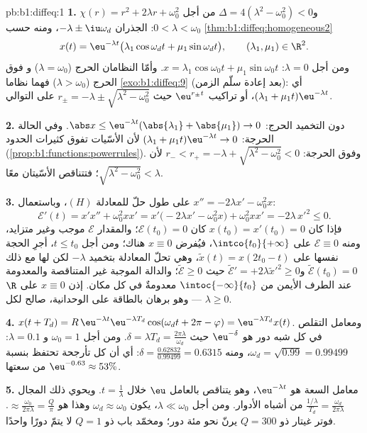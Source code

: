 \begin{solution}{pb:b1:diffeq:1}
\textbf{1.} $\chi(r) = r^2 + 2\lambda r + \omega_0^2$ و$\Delta =
4(\lambda^2 - \omega_0^2) < 0$ من أجل $0 < \lambda < \omega_0$: الجذران
$-\lambda \pm \iu\omega_d$، ومنه حسب
\cref{thm:b1:diffeq:homogeneous2}
\[
x(t) = \eu^{-\lambda t}\bigl(\lambda_1\cos\omega_d t +
\mu_1\sin\omega_d t\bigr), \qquad (\lambda_1, \mu_1) \in \R^2 .
\]
ومن أجل $\lambda = 0$: $x = \lambda_1\cos\omega_0 t +
\mu_1\sin\omega_0 t$. وأمّا النظامان الحرج ($\lambda = \omega_0$) و
فوق الحرج ($\lambda > \omega_0$) فهما نظاما
\cref{exo:b1:diffeq:9} (بعد إعادة سلّم الزمن): أي $(\lambda_1 +
\mu_1 t)\eu^{-\lambda t}$، أو تراكيب $\eu^{r_\pm t}$
حيث $r_\pm = -\lambda \pm \sqrt{\lambda^2 - \omega_0^2}$ على التوالي.

\textbf{2.} دون التخميد الحرج: $\abs x \leq \eu^{-\lambda
t}(\abs{\lambda_1} + \abs{\mu_1}) \to 0$. وفي الحالة الحرجة: $(\lambda_1 +
\mu_1 t)\eu^{-\lambda t} \to 0$ لأن الأسّيات تفوق
كثيرات الحدود (\cref{prop:b1:functions:powerrules}). وفوق الحرجة:
$r_- < r_+ = -\lambda + \sqrt{\lambda^2 - \omega_0^2} < 0$
لأن $\sqrt{\lambda^2 - \omega_0^2} < \lambda$؛ فتتناقص
الأسّيتان معًا.

\textbf{3.} على طول حلّ للمعادلة $(H)$، وباستعمال $x'' = -2\lambda x' -
\omega_0^2 x$:
\[
\mathcal E'(t) = x'x'' + \omega_0^2 x x'
= x'\bigl(-2\lambda x' - \omega_0^2 x\bigr) + \omega_0^2 xx'
= -2\lambda\,x'^2 \leq 0 .
\]
فإذا كان $x(t_0) = x'(t_0) = 0$ كان $\mathcal E(t_0) = 0$؛ والمقدار $\mathcal E$
موجب وغير متزايد، ومنه $\mathcal E \equiv 0$ على
$\intco{t_0}{+\infty}$، فيُفرض $x \equiv 0$ هناك؛ ومن أجل $t \leq
t_0$، أجرِ الحجة نفسها على $\tilde x(t) = x(2t_0 - t)$، وهي
تحلّ المعادلة بتخميد $-\lambda$ لكن لها مع ذلك
$\tilde{\mathcal E}(t_0) = 0$ و$\tilde{\mathcal E}' =
+2\lambda\tilde x'^2 \geq 0$ حيث $\tilde{\mathcal E} \geq 0$؛
والدالة الموجبة غير المتناقصة والمعدومة عند الطرف الأيمن من
$\intoc{-\infty}{t_0}$ معدومةٌ في كل مكان. إذن $x \equiv 0$ على
$\R$ --- وهو برهان بالطاقة على الوحدانية، صالح لكل $\lambda
\geq 0$.

\textbf{4.} $x(t + T_d) = R\,\eu^{-\lambda t}\eu^{-\lambda
T_d}\cos(\omega_d t + 2\pi - \varphi) = \eu^{-\lambda T_d}x(t)$.
ومعامل التقلص في كل شبه دور هو $\eu^{-\delta}$ حيث
$\delta = \lambda T_d = \frac{2\pi\lambda}{\omega_d}$. ومن أجل
$\omega_0 = 1$ و $\lambda = 0.1$: $\omega_d = \sqrt{0.99} =
0.99499$، ومنه $\delta = \frac{0.62832}{0.99499} = 0.6315$: أي أن كل
تأرجحة تحتفظ بنسبة $\eu^{-0.63} \approx 53\%$ من سعتها.

\textbf{5.} معامل السعة هو $\eu^{-\lambda t}$، وهو
يتناقص بالعامل $\eu$ خلال $t = \frac1\lambda$. ويحوي ذلك المجال
$\frac{1/\lambda}{T_d} = \frac{\omega_d}{2\pi\lambda}$
من أشباه الأدوار. ومن أجل $\lambda \ll \omega_0$، يكون $\omega_d \approx
\omega_0$ وهذا هو $\approx \frac{\omega_0}{2\pi\lambda} =
\frac Q\pi$. فوتر غيتار ذو $Q = 300$ يرنّ نحو مئة
دور؛ ومخمّد باب ذو $Q = 1$ لا يتمّ دورًا واحدًا.


\end{solution}

